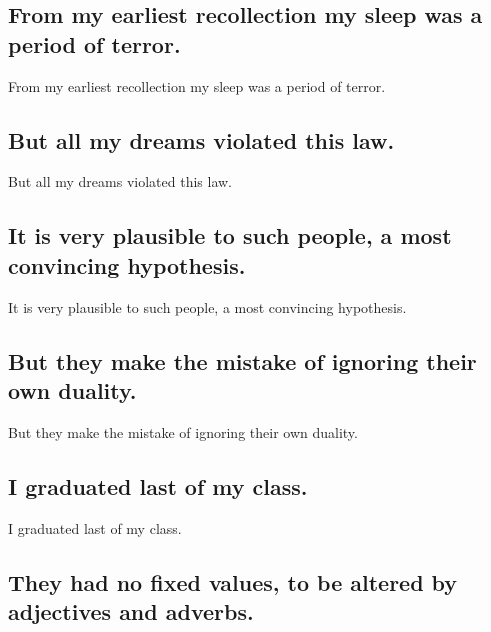 \documentclass[]{article}
\begin{document}
\hypertarget{from-my-earliest-recollection-my-sleep-was-a-period-of-terror.}{%
\subsection{From my earliest recollection my sleep was a period of
terror.}\label{from-my-earliest-recollection-my-sleep-was-a-period-of-terror.}}

From my earliest recollection my sleep was a period of terror.

\hypertarget{but-all-my-dreams-violated-this-law.}{%
\subsection{But all my dreams violated this
law.}\label{but-all-my-dreams-violated-this-law.}}

But all my dreams violated this law.

\hypertarget{it-is-very-plausible-to-such-people-a-most-convincing-hypothesis.}{%
\subsection{It is very plausible to such people, a most convincing
hypothesis.}\label{it-is-very-plausible-to-such-people-a-most-convincing-hypothesis.}}

It is very plausible to such people, a most convincing hypothesis.

\hypertarget{but-they-make-the-mistake-of-ignoring-their-own-duality.}{%
\subsection{But they make the mistake of ignoring their own
duality.}\label{but-they-make-the-mistake-of-ignoring-their-own-duality.}}

But they make the mistake of ignoring their own duality.

\hypertarget{i-graduated-last-of-my-class.}{%
\subsection{I graduated last of my
class.}\label{i-graduated-last-of-my-class.}}

I graduated last of my class.

\hypertarget{they-had-no-fixed-values-to-be-altered-by-adjectives-and-adverbs.}{%
\subsection{They had no fixed values, to be altered by adjectives and
adverbs.}\label{they-had-no-fixed-values-to-be-altered-by-adjectives-and-adverbs.}}
\end{document}
